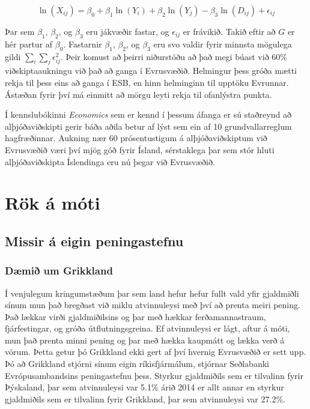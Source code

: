 \documentclass[a4paper]{article}
\begin{document}
\[\ln(X_{ij}) = \beta_{0} + \beta_{1}\ln(Y_{i}) + \beta_{2}\ln(Y_{j}) - \beta_{3}\ln(D_{ij}) + \epsilon_{ij}\]

Þar sem \(\beta_{1}\), \(\beta_{2}\), og \(\beta_{3}\) eru jákvæðir fastar, og \(\epsilon_{ij}\) er frávikið. Takið eftir að \(G\) er hér partur af \(\beta_{0}\). Fastarnir \(\beta_{1}\), \(\beta_{2}\), og \(\beta_{3}\) eru svo valdir fyrir minnsta mögulega gildi \(\sum_{i}\sum_{j}\epsilon_{ij}^{2}\).\cite{gravity_powerpoint} Þeir komust að þeirri niðurstöðu að það megi búast við 60\% viðskiptaaukningu við það að ganga í Evrusvæðið. Helmingur þess gróða mætti rekja til þess eins að ganga í ESB, en hinn helminginn til upptöku Evrunnar. Ástæðan fyrir því má einmitt að mörgu leyti rekja til ofanlýstra punkta.\cite{icb_wp_26}

Í kennslubókinni \textit{Economics} sem er kennd í þessum áfanga er sú staðreynd að alþjóðaviðskipti gerir báða aðila betur af lýst sem ein af 10 grundvallarreglum hagfræðinnar.\cite{economics} Aukning nær 60 prósentustigum á alþjóðaviðskiptum við Evrusvæðið væri því mjög góð fyrir Ísland, sérstaklega þar sem stór hluti alþjóðaviðskipta Íslendinga eru nú þegar við Evrusvæðið.\cite{hvada_gjaldmidill}

\section{Rök á móti}

\subsection{Missir á eigin peningastefnu}

\subsubsection{Dæmið um Grikkland}

Í venjulegum kringumstæðum þar sem land hefur hefur fullt vald yfir gjaldmiðli sínum mun það bregðast við miklu atvinnuleysi með því að prenta meiri pening. Það lækkar virði gjaldmiðilsins og þar með hækkar ferðamannastraum, fjárfestingar, og gróða útflutningsgreina. Ef atvinnuleysi er lágt, aftur á móti, mun það prenta minni pening og þar með hækka kaupmátt og lækka verð á vörum. Þetta getur þó Grikkland ekki gert af því hvernig Evrusvæðið er sett upp. Þó að Grikkland stjórni sínum eigin ríkisfjármálum, stjórnar Seðlabanki Evrópusambandsins peningastefnu þess.\cite{vox_greece} Styrkur gjaldmiðils sem er tilvalinn fyrir Þýskaland, þar sem atvinnuleysi var 5.1\% árið 2014 er allt annar en styrkur gjaldmiðils sem er tilvalinn fyrir Grikkland, þar sem atvinnuleysi var 27.2\%.\cite{eurostat}
\end{document}
